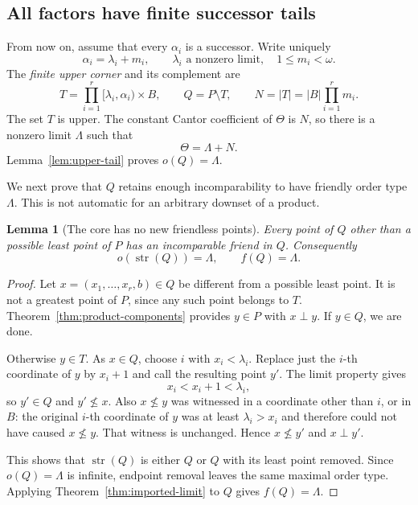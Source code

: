 \documentclass[11pt,letterpaper]{article}
\newtheorem{lemma}[theorem]{Lemma}
\theoremstyle{definition}
\theoremstyle{remark}
\newcommand{\str}{\operatorname{str}}
\begin{document}
\subsection{All factors have finite successor tails}
From now on, assume that every $\alpha_i$ is a successor. Write uniquely
\[
 \alpha_i=\lambda_i+m_i,
 \qquad \lambda_i\text{ a nonzero limit},\quad 1\le m_i<\omega.
\]
The \emph{finite upper corner} and its complement are
\begin{equation}\label{eq:corner}
 T=\prod_{i=1}^r[\lambda_i,\alpha_i)\times B,
 \qquad Q=P\setminus T,
 \qquad N=|T|=|B|\prod_{i=1}^r m_i.
\end{equation}
The set $T$ is upper. The constant Cantor coefficient of $\Theta$ is $N$,
so there is a nonzero limit $\Lambda$ such that
\begin{equation}\label{eq:theta-tail}
 \Theta=\Lambda+N.
\end{equation}
Lemma~\ref{lem:upper-tail} proves $o(Q)=\Lambda$.

We next prove that $Q$ retains enough incomparability to have friendly
order type $\Lambda$. This is not automatic for an arbitrary downset of a
product.

\begin{lemma}[The core has no new friendless points]\label{lem:core-stripped}
Every point of $Q$ other than a possible least point of $P$ has an
incomparable friend in $Q$. Consequently
\[
 o(\str(Q))=\Lambda,\qquad f(Q)=\Lambda.
\]
\end{lemma}
\begin{proof}
Let $x=(x_1,\ldots,x_r,b)\in Q$ be different from a possible least point.
It is not a greatest point of $P$, since any such point belongs to $T$.
Theorem~\ref{thm:product-components} provides $y\in P$ with $x\perp y$.
If $y\in Q$, we are done.

Otherwise $y\in T$. As $x\in Q$, choose $i$ with $x_i<\lambda_i$.
Replace just the $i$-th coordinate of $y$ by $x_i+1$ and call the resulting
point $y'$. The limit property gives
\[
 x_i<x_i+1<\lambda_i,
\]
so $y'\in Q$ and $y'\not\le x$. Also $x\not\le y$ was witnessed in a
coordinate other than $i$, or in $B$: the original $i$-th coordinate of
$y$ was at least $\lambda_i>x_i$ and therefore could not have caused
$x\not\le y$. That witness is unchanged. Hence $x\not\le y'$ and
$x\perp y'$.

This shows that $\str(Q)$ is either $Q$ or $Q$ with its least point
removed. Since $o(Q)=\Lambda$ is infinite, endpoint removal leaves the
same maximal order type. Applying Theorem~\ref{thm:imported-limit} to $Q$
gives $f(Q)=\Lambda$.
\end{proof}
\end{document}
